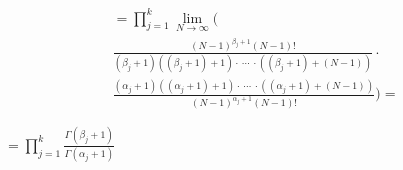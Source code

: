 \documentclass{article}
\begin{document}
\begin{multline*}
= \prod_{j=1}^{k} \lim_{N\to\infty} ( \\
\frac{{(N-1)}^{\beta_{j}+1}(N-1)!}{(\beta_{j} + 1)((\beta_{j} + 1) + 1) \cdot\ \cdots\ \cdot ((\beta_{j} + 1) + (N-1))} \cdot \\
\frac{(\alpha_{j} + 1)((\alpha_{j} + 1) + 1) \cdot\ \cdots\ \cdot ((\alpha_{j} + 1) + (N-1))}{{(N-1)}^{\alpha_{j}+1}(N-1)!}) =
\end{multline*}

\( = \prod_{j=1}^{k} \frac{\Gamma(\beta_{j} + 1)}{\Gamma(\alpha_{j} + 1)} \)
\end{document}
